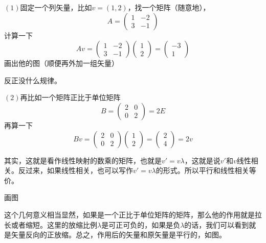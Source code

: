 \documentclass[11pt,a4paper,openany]{book}%
\theoremstyle{plain}%
\newcommand{\NO}[1]{{$(#1)$}}%
\begin{document}
\NO{1}固定一个列矢量，比如$v=(1,2)$，找一个矩阵（随意地），
\[
A=\begin{pmatrix}
1&-2\\
3&-1
\end{pmatrix}
\]
计算一下
\[
Av=\begin{pmatrix}
1&-2\\
3&-1
\end{pmatrix}
\begin{pmatrix}
1\\
2
\end{pmatrix}
=
\begin{pmatrix}
-3\\
1
\end{pmatrix}
\]
画出他的图（顺便再外加一组矢量）
\begin{center}
\end{center}
反正没什么规律。

\NO{2}再比如一个矩阵正比于单位矩阵
\[
B=\begin{pmatrix}
2&0\\
0&2
\end{pmatrix}
=2E
\]
再算一下
\[
Bv=\begin{pmatrix}
2&0\\
0&2
\end{pmatrix}
\begin{pmatrix}
1\\
2
\end{pmatrix}
=
\begin{pmatrix}
2\\
4
\end{pmatrix}
=2v
\]

其实，这就是看作线性映射的数乘的矩阵，也就是$v'=v \lambda$，这就是说$v'$和$v$线性相关。反过来，如果线性相关，也可以写作$v'=v \lambda$的形式。所以平行和线性相关等价。

画图
\begin{center}
\end{center}
这个几何意义相当显然，如果是一个正比于单位矩阵的矩阵，那么他的作用就是拉长或者缩短。这里的放缩比例$\lambda$是可正可负的，如果是负$\lambda$的话，我们可以看到就是矢量反向的正放缩。总之，作用后的矢量和原矢量是平行的，如图。
\end{document}
